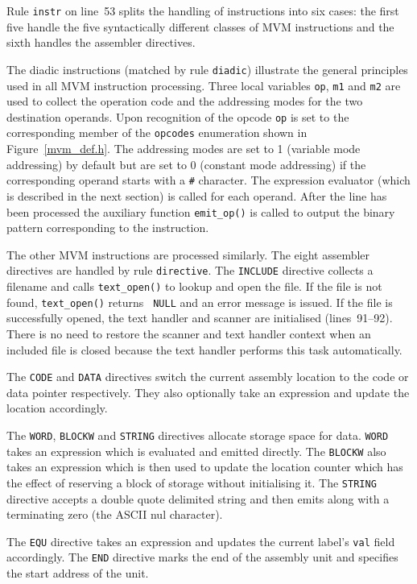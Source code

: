 Rule {\tt instr} on line~53 splits the handling of instructions into six cases:
the first five handle the five syntactically different classes of MVM instructions 
and the sixth handles the assembler directives. 

The diadic instructions (matched by rule {\tt diadic}) illustrate the
general principles used in all MVM instruction processing. Three local
variables {\tt op}, {\tt m1} and {\tt m2} are used to collect the
operation code and the addressing modes for the two destination
operands. Upon recognition of the opcode {\tt op} is set to the
corresponding member of the {\tt opcodes} enumeration shown in
Figure~\ref{mvm_def.h}. The addressing modes are set to 1 (variable mode
addressing) by default but are set to 0 (constant mode addressing) if
the corresponding operand starts with a \verb+#+ character. The
expression evaluator  (which is described in the next section) is called
for each operand. After the line has been processed the auxiliary
function \verb+emit_op()+ is called to output the binary pattern
corresponding to the instruction.

The other MVM instructions are processed similarly. The eight assembler
directives are handled by rule {\tt directive}. The {\tt INCLUDE}
directive collects a filename and calls \verb+text_open()+ to lookup and
open the file. If the file is not found, \verb+text_open()+ returns {\tt
NULL} and an error message is issued. If the file is successfully 
opened, the text handler and scanner are initialised (lines~91--92).
There is no need to restore the scanner and text handler context when an
included file is closed because the text handler performs
this task automatically.

The {\tt CODE} and {\tt DATA} directives switch the current assembly location to
the code or data pointer respectively. They also optionally take an expression
and update the location accordingly. 

The {\tt WORD}, {\tt BLOCKW} and {\tt STRING} directives allocate storage space for
data. {\tt WORD} takes an expression which is evaluated and emitted directly. The {\tt BLOCKW}
also takes an expression which is then used to update the location counter which has the
effect of reserving a block of storage without initialising it. The {\tt STRING} directive
accepts a double quote delimited string and then emits along with a terminating zero (the ASCII
{\sc nul} character).

The {\tt EQU} directive takes an expression and updates the current label's {\tt val}
field accordingly. The {\tt END} directive marks the end of the assembly unit and specifies
the start address of the unit.

